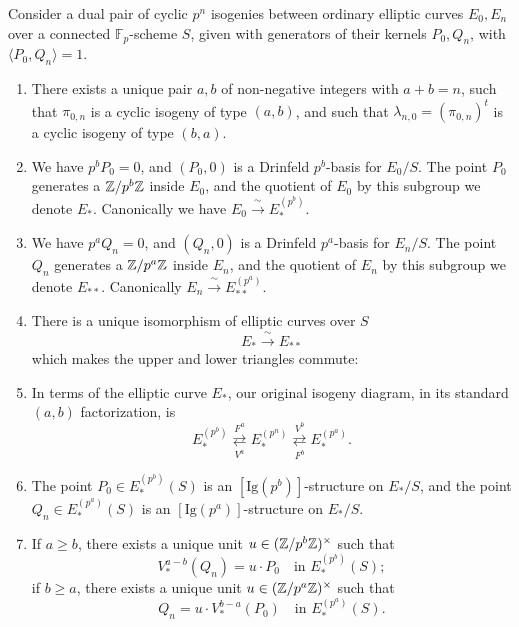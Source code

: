 \begin{kthm}\label{thm:13.11.2}
Consider a dual pair of cyclic $p^n$ isogenies between ordinary elliptic curves $E_0, E_n$ over a connected $\mathbb{F}_p$-scheme $S$, given with generators of their kernels $P_0, Q_n$, with $\langle P_0, Q_n \rangle = 1$.
\begin{enumerate}[(1)]
\item There exists a unique pair $a,b$ of non-negative integers with $a+b = n$, such that $\pi_{0,n}$ is a cyclic isogeny of type $(a,b)$, and such that $\lambda_{n,0} = (\pi_{0,n})^t$ is a cyclic isogeny of type $(b,a)$.
\item We have $p^b P_0 = 0$, and $(P_0, 0)$ is a Drinfeld $p^b$-basis for $E_0/S$. The point $P_0$ generates a $\mathbb{Z}/p^b\mathbb{Z}$ inside $E_0$, and the quotient of $E_0$ by this subgroup we denote $E_*$. Canonically we have $E_0 \xrightarrow{\ \sim\ } E_*^{(p^b)}$.
\item We have $p^a Q_n = 0$, and $(Q_n, 0)$ is a Drinfeld $p^a$-basis for $E_n/S$. The point $Q_n$ generates a $\mathbb{Z}/p^a\mathbb{Z}$ inside $E_n$, and the quotient of $E_n$ by this subgroup we denote $E_{**}$. Canonically $E_n \xrightarrow{\ \sim\ } E_{**}^{(p^a)}$.
\item There is a unique isomorphism of elliptic curves over $S$
\[
E_* \xrightarrow{\ \sim\ } E_{**}
\]
which makes the upper and lower triangles commute:
\begin{center}
\end{center}
\item In terms of the elliptic curve $E_*$, our original isogeny diagram, in its standard $(a,b)$ factorization, is
\[
E_*^{(p^b)} \overset{F^a}{\underset{V^a}{\rightleftarrows}} E_*^{(p^n)} \overset{V^b}{\underset{F^b}{\rightleftarrows}} E_*^{(p^a)} .
\]
\item The point $P_0 \in E_*^{(p^b)}(S)$ is an $[\mathrm{Ig}(p^b)]$-structure on $E_*/S$, and the point $Q_n \in E_*^{(p^a)}(S)$ is an $[\mathrm{Ig}(p^a)]$-structure on $E_*/S$.
\item If $a \ge b$, there exists a unique unit $u \in (\mathbb{Z}/p^b\mathbb{Z})^\times$ such that
\[
V_*^{a-b}(Q_n) = u \cdot P_0 \quad\text{in } E_*^{(p^b)}(S) ;
\]
if $b \ge a$, there exists a unique unit $u \in (\mathbb{Z}/p^a\mathbb{Z})^\times$ such that
\[
Q_n = u \cdot V_*^{b-a}(P_0) \quad\text{in } E_*^{(p^a)}(S) .
\]
\end{enumerate}
\end{kthm}


